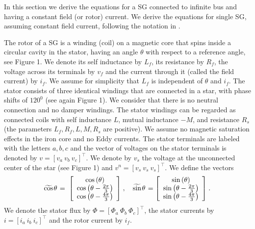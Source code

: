 \documentclass[conference]{IEEEtran}
\newcommand{\m}      {{\hbox{\hskip 1pt}}}
\begin{document}
In this section we derive the equations for a SG connected to infinite
bus and having a constant field (or rotor) current. We derive the equations for single SG, assuming constant field current,
following the notation in \cite{ZhWe:11}. 

The rotor of a SG is a winding (coil) on a magnetic core that spins
inside a circular cavity in the stator, having an angle $\theta$ with
respect to a reference angle, see Figure 1. We denote its self
inductance by $L_f$, its resistance by $R_f$, the voltage across its
terminals by $v_f$ and the current through it (called the field
current) by $i_f$. We assume for simplicity that $L_f$ is independent
of $\theta$ and $i_f$. The stator consists of three identical windings
that are connected in a star, with phase shifts of $120^0$ (see again
Figure 1). We consider that there is no neutral connection and no
damper windings. The stator windings can be regarded as connected
coils with self inductance $L$, mutual inductance $-M$, and resistance
$R_s$ (the parameters $L_f,R_f,L,M,R_s$ are positive). We assume no
magnetic saturation effects in the iron core and no Eddy currents. The
stator terminals are labeled with the letters $a,b,c$ and the vector
of voltages on the stator terminals is denoted by $v=\left[v_a\ v_b\
v_c\right]^\top$. We denote by $v_s$ the voltage at the unconnected 
center of the star (see Figure 1) and $v^n=[v_s\ v_s\ v_s]^\top$.
We define the vectors
$$ \widetilde{\cos}\m\theta \m=\m \left[\begin{array}{c} \cos\left(
   \theta\right)\\ \cos\left(\theta-\frac{2\pi}{3}\right)\\
   \cos\left(\theta-\frac{4\pi}{3}\right) \end{array}\right] \m,\quad
   \widetilde{\sin}\m\theta \m= \left[\begin{array}{c} \sin\left(
   \theta\right)\\ \sin\left(\theta-\frac{2\pi}{3}\right)\\ \sin\left
   (\theta-\frac{4\pi}{3}\right) \end{array}\right] \m.$$
We denote the stator flux by $\Phi=\left[\Phi_a\ \Phi_b\ \Phi_c
\right]^\top$, the stator currents by $i=\left[i_a\ i_b\ i_c\right]
^\top$ and the rotor current by $i_f$. 
\end{document}

